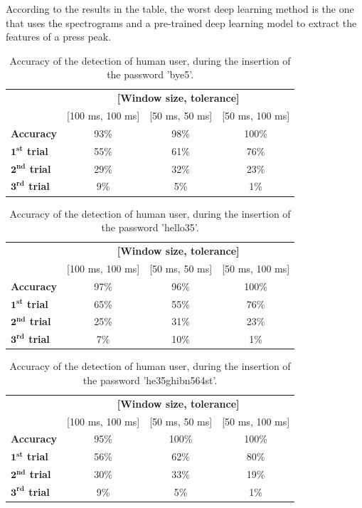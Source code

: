 According to the results in the table, the worst deep learning method is the one that uses the spectrograms and a pre-trained deep learning model to extract the features of a press peak.
\begin{table}[H]
\centering\footnotesize
\begin{tabular}{lccc}
\cline{2-4}
&\multicolumn{3}{c}{\textbf{[Window size, tolerance]}}\\
\cline{2-4}
&{[100 ms, 100 ms]}&{[50 ms, 50 ms]}&{[50 ms, 100 ms]}\\
\hline
{\textbf{Accuracy}}&{93\%}&{98\%}&{100\%}\\
\hline
{\textbf{$\mathbf{1^{st}}$ trial}}&{55\%}&{61\%}&{76\%}\\
\hline
{\textbf{$\mathbf{2^{nd}}$ trial}}&{29\%}&{32\%}&{23\%}\\
\hline
{\textbf{$\mathbf{3^{rd}}$ trial}}&{9\%}&{5\%}&{1\%}\\
\hline
\end{tabular}
\caption{\footnotesize{Accuracy of the detection of human user, during the insertion of the password 'bye5'.}}
\label{Results:bye5}
\end{table}
\begin{table}[H]
\centering\footnotesize
\begin{tabular}{lccc}
\cline{2-4}
&\multicolumn{3}{c}{\textbf{[Window size, tolerance]}}\\
\cline{2-4}
&{[100 ms, 100 ms]}&{[50 ms, 50 ms]}&{[50 ms, 100 ms]}\\
\hline
{\textbf{Accuracy}}&{97\%}&{96\%}&{100\%}\\
\hline
{\textbf{$\mathbf{1^{st}}$ trial}}&{65\%}&{55\%}&{76\%}\\
\hline
{\textbf{$\mathbf{2^{nd}}$ trial}}&{25\%}&{31\%}&{23\%}\\
\hline
{\textbf{$\mathbf{3^{rd}}$ trial}}&{7\%}&{10\%}&{1\%}\\
\hline
\end{tabular}
\caption{\footnotesize{Accuracy of the detection of human user, during the insertion of the password 'hello35'.}}
\label{Results:hello35}
\end{table}
\begin{table}[H]
\centering\footnotesize
\begin{tabular}{lccc}
\cline{2-4}
&\multicolumn{3}{c}{\textbf{[Window size, tolerance]}}\\
\cline{2-4}
&{[100 ms, 100 ms]}&{[50 ms, 50 ms]}&{[50 ms, 100 ms]}\\
\hline
{\textbf{Accuracy}}&{95\%}&{100\%}&{100\%}\\
\hline
{\textbf{$\mathbf{1^{st}}$ trial}}&{56\%}&{62\%}&{80\%}\\
\hline
{\textbf{$\mathbf{2^{nd}}$ trial}}&{30\%}&{33\%}&{19\%}\\
\hline
{\textbf{$\mathbf{3^{rd}}$ trial}}&{9\%}&{5\%}&{1\%}\\
\hline
\end{tabular}
\caption{\footnotesize{Accuracy of the detection of human user, during the insertion of the password 'he35ghibn564st'.}}
\label{Results:he35ghibn564st}
\end{table}
